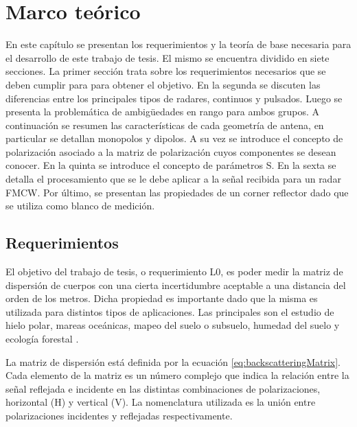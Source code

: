 
\chapter{Marco teórico} \label{ch:theory}


\ifpdf
    \graphicspath{{Chapter2/Figs/Raster/}{Chapter2/Figs/PDF/}{Chapter2/Figs/}}
\else
    \graphicspath{{Chapter2/Figs/Vector/}{Chapter2/Figs/}}
\fi

En este capítulo se presentan los requerimientos y la teoría de base necesaria para el desarrollo de este trabajo de tesis. El mismo se encuentra dividido en siete secciones. La primer sección trata sobre los requerimientos necesarios que se deben cumplir para para obtener el objetivo. En la segunda se discuten las diferencias entre los principales tipos de radares, continuos y pulsados. Luego se presenta la problemática de ambigüedades en rango para ambos grupos. A continuación se resumen las características de cada geometría de antena, en particular se detallan monopolos y dipolos. A su vez se introduce el concepto de polarización asociado a la matriz de polarización cuyos componentes se desean conocer. En la quinta se introduce el concepto de parámetros S. En la sexta se detalla el procesamiento que se le debe aplicar a la señal recibida para un radar FMCW. Por último, se presentan las propiedades de un corner reflector dado que se utiliza como blanco de medición.

\section{Requerimientos}

El objetivo del trabajo de tesis, o requerimiento L0, es poder medir la matriz de dispersión de cuerpos con una cierta incertidumbre aceptable a una distancia del orden de los metros. Dicha propiedad es importante dado que la misma es utilizada para distintos tipos de aplicaciones. Las principales son el estudio de hielo polar, mareas oceánicas, mapeo del suelo o subsuelo, humedad del suelo y ecología forestal \cite{Curlander}.

La matriz de dispersión está definida por la ecuación \ref{eq:backscatteringMatrix}. Cada elemento de la matriz es un número complejo que indica la relación entre la señal reflejada e incidente en las distintas combinaciones de polarizaciones, horizontal (H) y vertical (V). La nomenclatura utilizada es la unión entre polarizaciones incidentes y reflejadas respectivamente.

